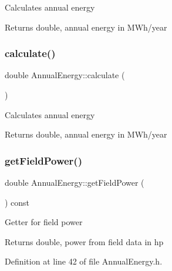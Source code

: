 Calculates annual energy \begin{DoxyReturn}{Returns}
double, annual energy in M\+Wh/year 
\end{DoxyReturn}
\mbox{\label{class_annual_energy_ab599860ffb32ce20a1042a3e9d2ad57f}} 
\subsubsection{\texorpdfstring{calculate()}{calculate()}\hspace{0.1cm}{\footnotesize\ttfamily [3/3]}}
{\footnotesize\ttfamily double Annual\+Energy\+::calculate (\begin{DoxyParamCaption}{ }\end{DoxyParamCaption})}

Calculates annual energy \begin{DoxyReturn}{Returns}
double, annual energy in M\+Wh/year 
\end{DoxyReturn}
\mbox{\label{class_annual_energy_a52aa52274243f578ea7f92d27707cacb}} 
\subsubsection{\texorpdfstring{get\+Field\+Power()}{getFieldPower()}\hspace{0.1cm}{\footnotesize\ttfamily [1/3]}}
{\footnotesize\ttfamily double Annual\+Energy\+::get\+Field\+Power (\begin{DoxyParamCaption}{ }\end{DoxyParamCaption}) const\hspace{0.3cm}{\ttfamily [inline]}}

Getter for field power \begin{DoxyReturn}{Returns}
double, power from field data in hp 
\end{DoxyReturn}


Definition at line 42 of file Annual\+Energy.\+h.

\mbox{\label{class_annual_energy_a52aa52274243f578ea7f92d27707cacb}} 
